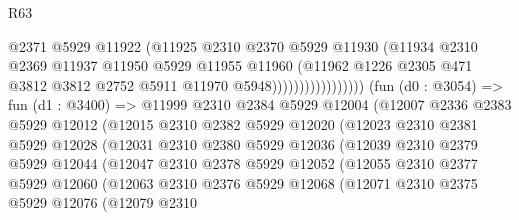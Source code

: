 \begin{lexlean}{R63}
\begin{coremodule}
                                    @2371
                                    @5929
                                    @11922
                                    (@11925
                                      @2310
                                      @2370
                                      @5929
                                      @11930
                                      (@11934
                                        @2310
                                        @2369
                                        @11937
                                        @11950
                                        @5929
                                        @11955
                                        @11960
                                        (@11962
                                          @1226
                                          @2305
                                          @471
                                          @3812
                                          @3812
                                          @2752
                                          @5911
                                          @11970
                                          @5948)))))))))))))))))
        (fun (d0 : @3054) =>
        fun (d1 : @3400) =>
        @11999
          @2310
          @2384
          @5929
          @12004
          (@12007
            @2336
            @2383
            @5929
            @12012
            (@12015
              @2310
              @2382
              @5929
              @12020
              (@12023
                @2310
                @2381
                @5929
                @12028
                (@12031
                  @2310
                  @2380
                  @5929
                  @12036
                  (@12039
                    @2310
                    @2379
                    @5929
                    @12044
                    (@12047
                      @2310
                      @2378
                      @5929
                      @12052
                      (@12055
                        @2310
                        @2377
                        @5929
                        @12060
                        (@12063
                          @2310
                          @2376
                          @5929
                          @12068
                          (@12071
                            @2310
                            @2375
                            @5929
                            @12076
                            (@12079
                              @2310

\end{coremodule}
\end{lexlean}
